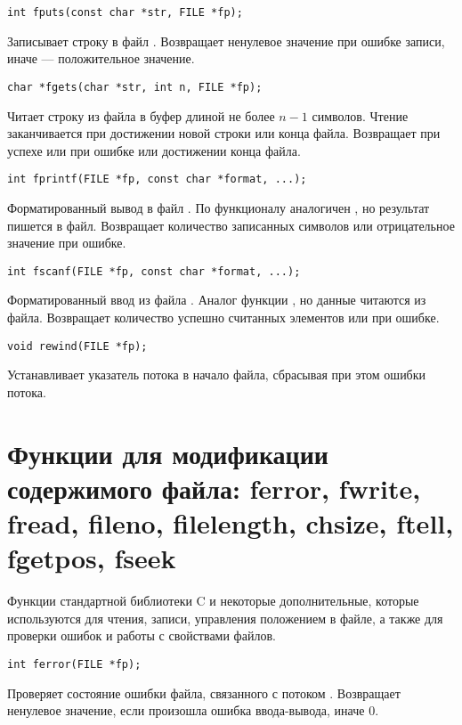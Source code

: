 \begin{verbatim}
int fputs(const char *str, FILE *fp);
\end{verbatim}
Записывает строку  в файл . Возвращает ненулевое значение при ошибке записи, иначе — положительное значение.

\begin{verbatim}
char *fgets(char *str, int n, FILE *fp);
\end{verbatim}
Читает строку из файла  в буфер  длиной не более $n-1$ символов. Чтение заканчивается при достижении новой строки или конца файла. Возвращает  при успехе или  при ошибке или достижении конца файла.

\begin{verbatim}
int fprintf(FILE *fp, const char *format, ...);
\end{verbatim}
Форматированный вывод в файл . По функционалу аналогичен , но результат пишется в файл. Возвращает количество записанных символов или отрицательное значение при ошибке.

\begin{verbatim}
int fscanf(FILE *fp, const char *format, ...);
\end{verbatim}
Форматированный ввод из файла . Аналог функции , но данные читаются из файла. Возвращает количество успешно считанных элементов или  при ошибке.

\begin{verbatim}
void rewind(FILE *fp);
\end{verbatim}
Устанавливает указатель потока  в начало файла, сбрасывая при этом ошибки потока.


\section{Функции для модификации содержимого файла: ferror, fwrite, fread, fileno, filelength, chsize, ftell, fgetpos, fseek}
Функции стандартной библиотеки C и некоторые дополнительные, которые используются для чтения, записи, 
управления положением в файле, а также для проверки ошибок и работы с свойствами файлов.

\begin{verbatim}
int ferror(FILE *fp);
\end{verbatim}
Проверяет состояние ошибки файла, связанного с потоком . Возвращает ненулевое значение, если произошла ошибка ввода-вывода, иначе 0.

